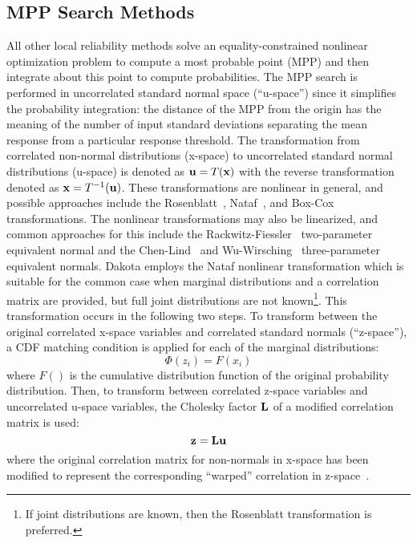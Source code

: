 

\subsection{MPP Search Methods}\label{uq:reliability:local:mpp}

All other local reliability methods solve an equality-constrained nonlinear
optimization problem to compute a most probable point (MPP) and then
integrate about this point to compute probabilities.  The MPP search
is performed in uncorrelated standard normal space (``u-space'') since
it simplifies the probability integration: the distance of the MPP
from the origin has the meaning of the number of input standard
deviations separating the mean response from a particular response
threshold.  The transformation from correlated non-normal
distributions (x-space) to uncorrelated standard normal distributions
(u-space) is denoted as ${\bf u} = T({\bf x})$ with the reverse
transformation denoted as ${\bf x} = T^{-1}({\bf u})$.  These
transformations are nonlinear in general, and possible approaches
include the Rosenblatt~\cite{Ros52}, Nataf~\cite{Der86}, and
Box-Cox~\cite{Box64} transformations.  The nonlinear transformations
may also be linearized, and common approaches for this include the
Rackwitz-Fiessler~\cite{Rac78} two-parameter equivalent normal and the
Chen-Lind~\cite{Che83} and Wu-Wirsching~\cite{Wu87} three-parameter
equivalent normals.  Dakota employs the Nataf nonlinear transformation
which is suitable for the common case when marginal distributions and
a correlation matrix are provided, but full joint distributions are
not known\footnote{If joint distributions are known, then the
Rosenblatt transformation is preferred.}.  This transformation occurs 
in the following two steps.  To transform between the
original correlated x-space variables and correlated standard normals
(``z-space''), a CDF matching condition is applied for each of the
marginal distributions:
\begin{equation}
\Phi(z_i) = F(x_i) \label{eq:trans_zx}
\end{equation}
where $F()$ is the cumulative distribution function of the original
probability distribution.  Then, to transform between correlated
z-space variables and uncorrelated u-space variables, the Cholesky 
factor ${\bf L}$ of a modified correlation matrix is used:
\begin{equation}
{\bf z} = {\bf L} {\bf u} \label{eq:trans_zu}
\end{equation}
where the original correlation matrix for non-normals in x-space has
been modified to represent the corresponding ``warped'' correlation in 
z-space~\cite{Der86}.

